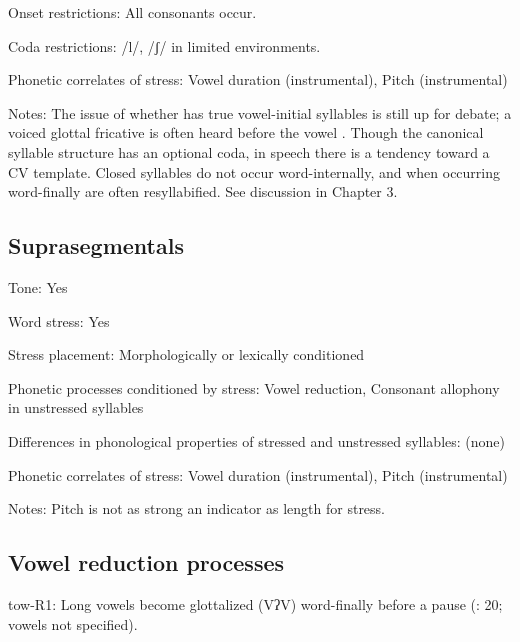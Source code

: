 {\begin{appendixdesc}
\item[Onset restrictions:] All consonants occur.

\item[Coda restrictions:] /l/, /ʃ/ in limited environments.

\item[Phonetic correlates of stress:] Vowel duration (instrumental), Pitch (instrumental)

\item[Notes:] The issue of whether  has true vowel-initial syllables is still up for debate; a voiced glottal fricative is often heard before the vowel \citep[22--23]{Yumitani1998}. Though the canonical syllable structure has an optional coda, in speech there is a tendency toward a CV template. Closed syllables do not occur word-internally, and when occurring word-finally are often resyllabified. See discussion in Chapter 3.
\end{appendixdesc}
\subsection*{Suprasegmentals}
\begin{appendixdesc}
\item[Tone:] Yes

\item[Word stress:] Yes

\item[Stress placement:] Morphologically or lexically conditioned

\item[Phonetic processes conditioned by stress:] Vowel reduction, Consonant allophony in unstressed syllables

\item[Differences in phonological properties of stressed and unstressed syllables:] (none)

\item[Phonetic correlates of stress:] Vowel duration (instrumental), Pitch (instrumental)

\item[Notes:] Pitch is not as strong an indicator as length for stress.
\end{appendixdesc}
\subsection*{Vowel reduction processes}
\begin{appendixdesc}

\item[tow-R1:] Long vowels become glottalized (VʔV) word-finally before a pause (\citealt{Yumitani1998}: 20; vowels not specified).


\end{appendixdesc}}
